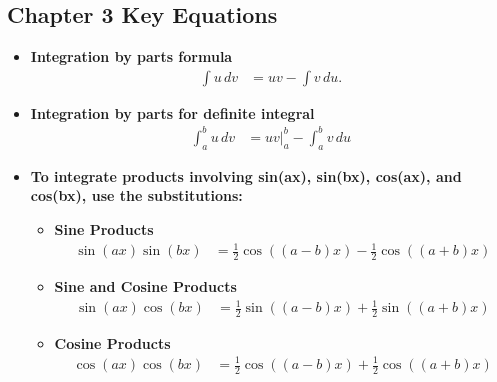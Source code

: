 \documentclass{report}
\begin{document}
    \pagebreak \bigbreak \noindent 
    \subsection{Chapter 3 Key Equations}
    \bigbreak \noindent 
    \begin{itemize}
        \item \textbf{Integration by parts formula} 
            \begin{align*}
                \int u \, dv &= uv - \int v \, du 
            .\end{align*}
        \item \textbf{Integration by parts for definite integral}
            \begin{align*}
                \int_{a}^{b} u \, dv &= uv\big|_{a}^{b} - \int_{a}^{b} v \, du
            \end{align*}
        \item \textbf{To integrate products involving  sin(ax), sin(bx), cos(ax), and  cos(bx), use the substitutions:}
            \begin{itemize}
                \item \textbf{Sine Products}
                \begin{align*}
                    \sin(ax) \sin(bx) &= \frac{1}{2} \cos((a-b)x) - \frac{1}{2} \cos((a+b)x)
                \end{align*}

                \item \textbf{Sine and Cosine Products}
                \begin{align*}
                    \sin(ax) \cos(bx) &= \frac{1}{2} \sin((a-b)x) + \frac{1}{2} \sin((a+b)x)
                \end{align*}

                \item \textbf{Cosine Products}
                \begin{align*}
                    \cos(ax) \cos(bx) &= \frac{1}{2} \cos((a-b)x) + \frac{1}{2} \cos((a+b)x)
                \end{align*}


\end{itemize}
\end{itemize}
\end{document}
